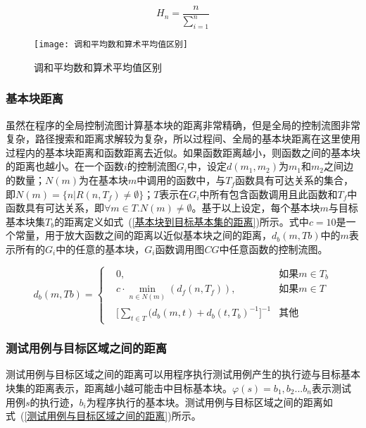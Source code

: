 \begin{equation}\label{调和平均数}
H_{n} = \frac{n}{\sum_{i=1}^{n}}
\end{equation}

\begin{figure}[htb]
\begin{center}
\texttt{[image: 调和平均数和算术平均值区别]}
\end{center}
\caption{调和平均数和算术平均值区别}
\label{调和平均数和算术平均值区别}
\end{figure}

\subsubsection{基本块距离}

虽然在程序的全局控制流图计算基本块的距离非常精确，但是全局的控制流图非常复杂，路径搜索和距离求解较为复杂，所以过程间、全局的基本块距离在这里使用过程内的基本块距离和函数距离去近似。如果函数距离越小，则函数之间的基本块的距离也越小。在一个函数$i$的控制流图$G_i$中，设定$d(m_1,m_2)$为$m_1$和$m_2$之间边的数量；$N(m)$为在基本块$m$中调用的函数中，与$T_f$函数具有可达关系的集合，即$N(m) = \{n | R(n, T_f) \neq \emptyset \}$；$T$表示在$G_i$中所有包含函数调用且此函数和$T_f$中函数具有可达关系，即$\forall m \in T.N(m) \neq \emptyset$。基于以上设定，每个基本块$m$与目标基本块集$T_b$的距离定义如式~(\ref{基本块到目标基本集的距离})所示。式中$c=10$是一个常量，用于放大函数之间的距离以近似基本块之间的距离，$d_{b}(m,Tb)$中的$m$表示所有的$G_i$中的任意的基本块，$G_i$函数调用图$CG$中任意函数的控制流图。

\begin{equation}\label{基本块到目标基本集的距离}
d_{b}(m,Tb)=\left\{
\begin{aligned}
& 0, & \text{如果} m \in T_{b} \\
& c \cdot \min\limits_{n \in N(m)}(d_{f}(n,T_{f})), & \text{如果} m \in T \\
& \lbrack \sum_{t \in T}(d_{b}(m,t) + d_{b}(t,T_{b}) ^{-1}\rbrack^{-1} & \text{其他}
\end{aligned}
\right.
\end{equation} 

\subsubsection{测试用例与目标区域之间的距离}

测试用例与目标区域之间的距离可以用程序执行测试用例产生的执行迹与目标基本块集的距离表示，距离越小越可能击中目标基本块。$\varphi(s)={b_1,b_2...b_n}$表示测试用例$s$的执行迹，$b_i$为程序执行的基本块。测试用例与目标区域之间的距离如式~(\ref{测试用例与目标区域之间的距离})所示。

